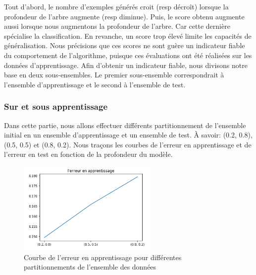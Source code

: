 \documentclass{article}
\begin{document}
Tout d'abord, le nombre d'exemples générés croit (resp décroît) lorsque la profondeur de l'arbre augmente (resp diminue). Puis, le score obtenu augmente aussi lorsque nous augmentons la profondeur de l'arbre. Car cette dernière spécialise la classification. En revanche, un score trop élevé limite les capacités de généralisation.
\linebreak
\linebreak
 Nous précisions que ces scores ne sont guère un indicateur fiable du comportement de l’algorithme, puisque ces évaluations ont été réalisées sur les données d’apprentissage. Afin d'obtenir un indicateur fiable, nous divisons notre base en deux sous-ensembles. Le premier sous-ensemble correspondrait à l'ensemble d'apprentissage et le second à l'ensemble de test.
 


\subsubsection{Sur et sous apprentissage}
Dans cette partie, nous allons effectuer différents partitionnement de l'ensemble initial en un ensemble d'apprentissage et un ensemble de test. À savoir: (0.2, 0.8), (0.5, 0.5) et (0.8, 0.2). Nous traçons les courbes de l'erreur en apprentissage et de l’erreur en test en fonction de la profondeur du
modèle. 

\begin{figure}[H]
  \begin{center}
    \includegraphics[width=0.6\textwidth]{erreur_app_part.png}
    \caption{Courbe de l’erreur en apprentissage pour différentes partitionnements de l'ensemble des données}
  \end{center}
\end{figure}
\end{document}
